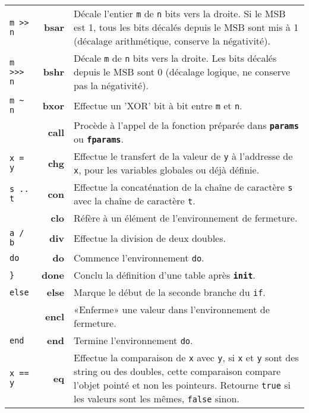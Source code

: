 \documentclass{article}
\begin{document}
\begin{longtable}{p{2cm} r p{12cm}}
  {\lstinline$m >> n$} & \textbf{bsar} & Décale l'entier \texttt{m} de \texttt{n} bits vers la droite. Si le MSB est 1, tous les bits décalés depuis le MSB sont mis à 1 (décalage arithmétique, conserve la négativité).\\
  {\lstinline$m >>> n$} & \textbf{bshr} & Décale \texttt{m} de \texttt{n} bits vers la droite. Les bits décalés depuis le MSB sont 0 (décalage logique, ne conserve pas la négativité).\\
  {\lstinline$m ~ n$}  & \textbf{bxor} & Effectue un 'XOR' bit à bit entre \texttt{m} et \texttt{n}.\\
   & \textbf{call} & Procède à l'appel de la fonction préparée dans \texttt{\textbf{params}} ou \texttt{\textbf{fparams}}.\\
  {\lstinline$x = y$} & \textbf{chg} & Effectue le transfert de la valeur de \texttt{y} à l'addresse de \texttt{x}, pour les variables globales ou déjà définie.\\
  {\lstinline$s .. t$} & \textbf{con} & Effectue la concaténation de la chaîne de caractère \texttt{s} avec la chaîne de caractère \texttt{t}.\\
   & \textbf{clo} & Réfère à un élément de l'environnement de fermeture.\\
  {\lstinline$a / b$} & \textbf{div} & Effectue la division de deux doubles.\\
  {\lstset{style=lua}\lstinline$do$} & \textbf{do} & Commence l'environnement {\lstset{style=lua}\lstinline$do$}.\\
  {\lstset{style=lua}\lstinline$}$} & \textbf{done} & Conclu la définition d'une table après \texttt{\textbf{init}}.\\
  {\lstset{style=lua}\lstinline$else$} & \textbf{else} & Marque le début de la seconde branche du {\lstset{style=lua}\lstinline$if$}.\\
   & \textbf{encl} & «Enferme» une valeur dans l'environnement de fermeture.\\
  {\lstset{style=lua}\lstinline$end$} & \textbf{end} & Termine l'environnement {\lstset{style=lua}\lstinline$do$}.\\
  {\lstinline$x == y$} & \textbf{eq} & Effectue la comparaison de \texttt{x} avec \texttt{y}, si \texttt{x} et \texttt{y} sont des string ou des doubles, cette comparaison compare l'objet pointé et non les pointeurs. Retourne {\lstset{style=lua}\lstinline$true$} si les valeurs sont les mêmes, {\lstset{style=lua}\lstinline$false$} sinon.\\

\end{longtable}
\end{document}
